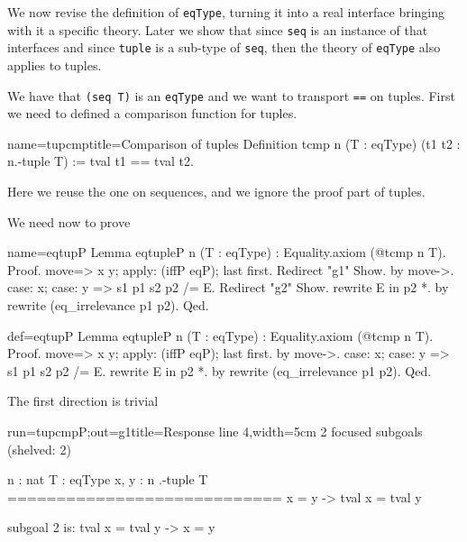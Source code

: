 We now revise the definition of \lstinline/eqType/, turning it into a
real interface bringing with it a specific theory.  Later we show that
since \lstinline/seq/ is an instance of that interfaces and since
\lstinline/tuple/ is a sub-type of \lstinline/seq/, then the theory
of \lstinline/eqType/ also applies to tuples.


We have that \lstinline/(seq T)/ is an \lstinline/eqType/ and
we want to transport \lstinline/==/ on tuples.  First we need to
defined a comparison function for tuples.

\begin{coq}{name=tupcmp}{title=Comparison of tuples}
Definition tcmp n (T : eqType) (t1 t2 : n.-tuple T) :=
  tval t1 == tval t2.
\end{coq}

Here we reuse the one on sequences, and we ignore the
proof part of tuples.

We need now to prove

\begin{coqdef}{name=eqtupP}
Lemma eqtupleP n (T : eqType) : Equality.axiom (@tcmp n T).
Proof.
move=> x y; apply: (iffP eqP); last first.
Redirect "g1" Show.
  by move->.
case: x; case: y => s1 p1 s2 p2 /= E. Redirect "g2" Show.
rewrite E in p2 *.
by rewrite (eq_irrelevance p1 p2).
Qed.
\end{coqdef}
\begin{coq}{def=eqtupP}{}
Lemma eqtupleP n (T : eqType) : Equality.axiom (@tcmp n T).
Proof.
move=> x y; apply: (iffP eqP); last first.
  by move->.
case: x; case: y => s1 p1 s2 p2 /= E.
rewrite E in p2 *.
by rewrite (eq_irrelevance p1 p2).
Qed.
\end{coq}

The first direction is trivial

\begin{coqout}{run=tupcmpP;out=g1}{title=Response line 4,width=5cm}
2 focused subgoals (shelved: 2)

n : nat
T : eqType
x, y : n .-tuple T
============================
x = y -> tval x = tval y

subgoal 2 is:
  tval x = tval y -> x = y
\end{coqout}

